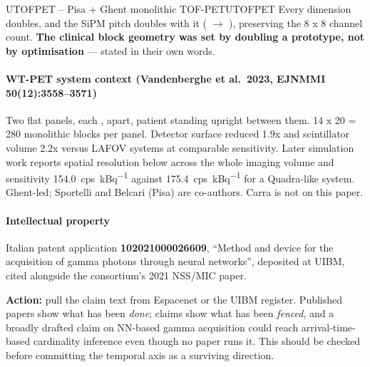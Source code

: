 \begin{programnote}{UTOFPET -- Pisa + Ghent monolithic TOF-PET}{UTOFPET}
Every dimension doubles, and the SiPM pitch doubles with it (
$\rightarrow$ ), preserving the 8 x 8 channel count. \textbf{The clinical
block geometry was set by doubling a prototype, not by optimisation} --- stated
in their own words. 

\paragraph{WT-PET system context (Vandenberghe et al.\ 2023, EJNMMI 50(12):3558--3571)}
Two flat panels, each ,  apart, patient
standing upright between them. 14 x 20 = 280 monolithic blocks per panel.
Detector surface reduced 1.9x and scintillator volume 2.2x versus LAFOV systems
at comparable sensitivity. Later simulation work reports spatial resolution below
 across the whole imaging volume and sensitivity \qty{154.0}{cps\per\kilo\becquerel}
against \qty{175.4}{cps\per\kilo\becquerel} for a Quadra-like system. Ghent-led;
Sportelli and Belcari (Pisa) are co-authors. Carra is not on this paper.


\paragraph{Intellectual property}
Italian patent application \textbf{102021000026609}, ``Method and device for the
acquisition of gamma photons through neural networks'', deposited at UIBM,
cited alongside the consortium's 2021 NSS/MIC paper.

\textbf{Action:} pull the claim text from Espacenet or the UIBM register.
Published papers show what has been \emph{done}; claims show what has been
\emph{fenced}, and a broadly drafted claim on NN-based gamma acquisition could
reach arrival-time-based cardinality inference even though no paper runs it.
This should be checked before committing the temporal axis as a surviving
direction.


\end{programnote}
